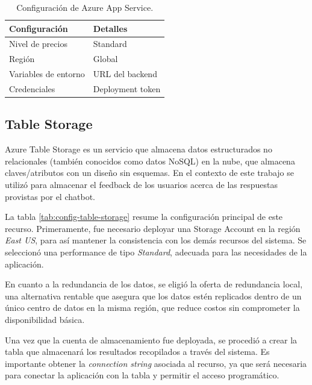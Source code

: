 \begin{table}[h]
	\centering
	\caption[Configuración de Azure App Service]{Configuración de Azure App Service.}
	\begin{tabular}{l l}    
		\toprule
		\textbf{Configuración} 	& \textbf{Detalles} \\
		\midrule
		Nivel de precios        & Standard          \\
		Región                  & Global 			\\		
		Variables de entorno    & URL del backend	\\
		Credenciales            & Deployment token  \\
		\bottomrule
		\hline
	\end{tabular}
	\label{tab:config-static-webapp}
\end{table}

\subsection{Table Storage}

Azure Table Storage es un servicio que almacena datos estructurados no relacionales (también conocidos como datos NoSQL) en la nube, que almacena claves/atributos 
con un diseño sin esquemas. En el contexto de este trabajo se utilizó para almacenar el feedback de los usuarios acerca de las respuestas provistas por el chatbot.

La tabla \ref{tab:config-table-storage} resume la configuración principal de este recurso. Primeramente, fue necesario deployar una Storage Account en la región \textit{East US}, para así mantener la consistencia con los demás 
recursos del sistema. Se seleccionó una performance de tipo \textit{Standard}, adecuada para las necesidades de la aplicación.

En cuanto a la redundancia de los datos, se eligió la oferta de redundancia local, una alternativa rentable que asegura que los datos 
estén replicados dentro de un único centro de datos en la misma región, que reduce costos sin comprometer la disponibilidad básica.

Una vez que la cuenta de almacenamiento fue deployada, se procedió a crear la tabla que almacenará los resultados 
recopilados a través del sistema. Es importante obtener la \textit{connection string} asociada al recurso, ya que será 
necesaria para conectar la aplicación con la tabla y permitir el acceso programático. 

